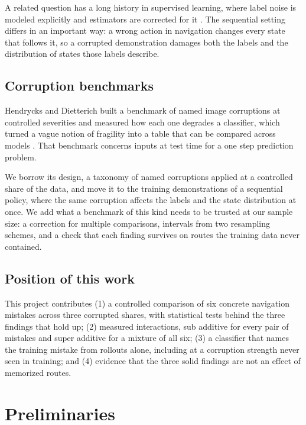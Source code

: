 \documentclass[conference]{IEEEtran}
\begin{document}
A related question has a long history in supervised learning, where label noise is modeled explicitly and
estimators are corrected for it \cite{natarajan}. The sequential setting differs in an important way: a wrong
action in navigation changes every state that follows it, so a corrupted demonstration damages both the labels
and the distribution of states those labels describe.

\subsection{Corruption benchmarks}
Hendrycks and Dietterich built a benchmark of named image corruptions at controlled severities and measured how
each one degrades a classifier, which turned a vague notion of fragility into a table that can be compared across
models \cite{hendrycks}. That benchmark concerns inputs at test time for a one step prediction problem.

We borrow its design, a taxonomy of named corruptions applied at a controlled share of the data, and move it to
the training demonstrations of a sequential policy, where the same corruption affects the labels and the state
distribution at once. We add what a benchmark of this kind needs to be trusted at our sample size: a correction
for multiple comparisons, intervals from two resampling schemes, and a check that each finding survives on routes
the training data never contained.

\subsection{Position of this work}
This project contributes (1) a controlled comparison of six concrete navigation mistakes across three corrupted
shares, with statistical tests behind the three findings that hold up; (2) measured interactions, sub additive for
every pair of mistakes and super additive for a mixture of all six; (3) a classifier that names the training
mistake from rollouts alone, including at a corruption strength never seen in training; and (4) evidence that the
three solid findings are not an effect of memorized routes.

\section{Preliminaries}
\end{document}
